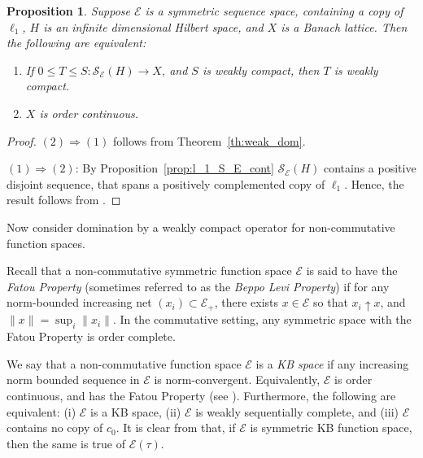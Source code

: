\documentclass[12pt]{amsart}
\theoremstyle{plain}
\newtheorem{proposition}[theorem]{Proposition}
\theoremstyle{definition}
\newtheorem{question}[theorem]{Question}
\newcommand{\ce}{\mathcal E}
\newcommand{\se}{{\mathcal S}_{\mathcal{E}}}
\begin{document}


\begin{proposition}\label{prop:se_criterion}
Suppose $\ce$ is a symmetric sequence space, containing
a copy of $\ell_1$, $H$ is an infinite dimensional Hilbert space,
and $X$ is a Banach lattice.
Then the following are equivalent:
\begin{enumerate}
\item If $0 \le T \le S:\se(H) \to X$, and $S$ is weakly compact,
 then $T$ is weakly  compact.
\item $X$ is order continuous.
\end{enumerate}
\end{proposition}

\begin{proof} %
$(2) \Rightarrow (1)$ follows from Theorem~\ref{th:weak_dom}.

$(1) \Rightarrow (2)$: By Proposition~\ref{prop:l_1_S_E_cont}
$\se(H)$ contains a positive disjoint sequence, that spans a positively
complemented copy of $\ell_1$. Hence, the result follows from
\cite[Theorem~5.31]{AB}.
\end{proof}

Now consider domination by a weakly compact operator for
non-commutative function spaces.

Recall that a non-commutative symmetric function space $\ce$
is said to have the \emph{Fatou Property} (sometimes referred to
as the \emph{Beppo Levi Property}) if for any norm-bounded increasing net
$(x_i) \subset \ce_+$, there exists $x \in \ce$ so that $x_i \uparrow x$, and
$\|x\| = \sup_i \|x_i\|$. In the commutative setting, any symmetric
space with the Fatou Property is order complete.

We say that a non-commutative function space $\ce$ is a \emph{KB space}
if any increasing norm bounded sequence in $\ce$ is
norm-convergent. Equivalently, $\ce$ is order continuous, and
has the Fatou Property (see \cite{DdP11}). Furthermore, the following
are equivalent: (i) $\ce$ is a KB space, (ii) $\ce$ is weakly
sequentially complete, and (iii) $\ce$ contains no copy of $c_0$.
It is clear from \cite{DDdP93} that, if $\ce$ is symmetric KB function
space, then the same is true of $\ce(\tau)$.
\end{document}
